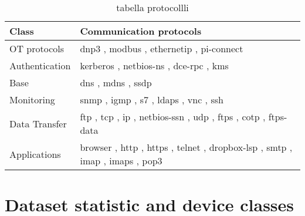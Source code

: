 \begin{table}
\centering
\begin{tabular}{|l|l|}
\hline
\textbf{Class} & \textbf{Communication protocols} \\
\hline
OT protocols   &  dnp3 ,  modbus ,  ethernetip ,   pi-connect \\
Authentication & kerberos ,  netbios-ns ,  dce-rpc ,  kms \\
Base           & dns ,  mdns ,  ssdp \\
Monitoring     & snmp ,  igmp ,  s7 ,  ldaps ,  vnc ,  ssh \\
Data Transfer  & ftp ,  tcp ,  ip ,  netbios-ssn ,  udp ,  ftps ,  cotp ,   ftps-data \\
Applications   & browser ,  http ,  https ,  telnet ,    dropbox-lsp ,  smtp ,  imap ,  imaps ,  pop3  \\
\hline
\end{tabular}
\caption{tabella protocollli}
\label{tab:protolist}
\end{table}




\section{Dataset statistic and device classes}
\lipsum[1]


